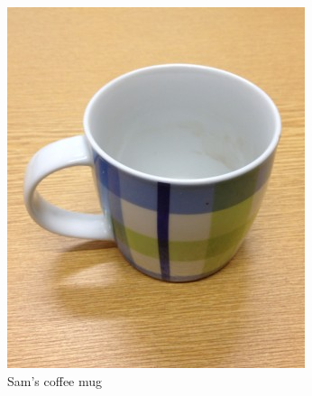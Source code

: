 \documentclass[12pt,final,twoside]{report}
\theoremstyle{plain}
\theoremstyle{definition}
\theoremstyle{remark}
\begin{document}
\begin{figure}[tbhp]
  \centering
  \begin{subfigure}[b]{.3\textwidth}
    \includegraphics[width=\textwidth]{themug}
    \caption{Sam's coffee mug}
  \end{subfigure}
  ~
  \begin{subfigure}[b]{.3\textwidth}
    \centering

\end{subfigure}
\end{figure}
\end{document}
